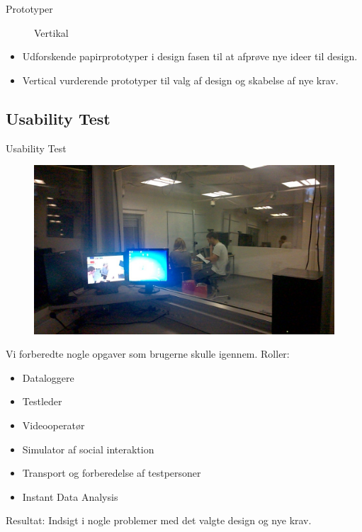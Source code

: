 \begin{frame}{Prototyper}
\begin{multicols}{2}
\begin{figure}
			\caption{Vertikal}
		\end{figure}
	\end{multicols}
	\begin{itemize}
	\item Udforskende papirprototyper i design fasen til at afprøve nye ideer til design.
	\item Vertical vurderende prototyper til valg af design og skabelse af nye krav.
	\end{itemize}
\end{frame}
\subsection{Usability Test}
\begin{frame}{Usability Test}
	\begin{multicols}{2}
		\begin{figure}
			\centering
			\includegraphics[width=\textwidth/2]{slides/Heider/subjectRoom}
		\end{figure}
		\columnbreak
		Vi forberedte nogle opgaver som brugerne skulle igennem.
		Roller:
		\begin{itemize}
			\item Dataloggere
			\item Testleder
			\item Videooperatør
			\item Simulator af social interaktion
			\item Transport og forberedelse af testpersoner
		\end{itemize}
	\end{multicols}
	\begin{itemize}
		\item Instant Data Analysis
	\end{itemize}

	Resultat: Indsigt i nogle problemer med det valgte design og nye krav.
\end{frame}
